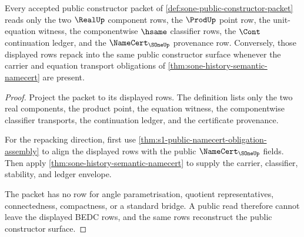 \begin{theorem}
\label{thm:sone-public-constructor-scope}
Every accepted public constructor packet of
\autoref{def:sone-public-constructor-packet} reads only the two $\RealUp$
component rows, the $\ProdUp$ point row, the unit-equation witness, the
componentwise $\hsame$ classifier rows, the $\Cont$ continuation ledger, and the
$\NameCert_{\SOneUp}$ provenance row. Conversely, those displayed rows repack
into the same public constructor surface whenever the carrier and equation
transport obligations of \autoref{thm:sone-history-semantic-namecert} are
present.
\end{theorem}
\begin{proof}
Project the packet to its displayed rows. The definition lists only the two real
components, the product point, the equation witness, the componentwise
classifier transports, the continuation ledger, and the certificate provenance.

For the repacking direction, first use
\autoref{thm:s1-public-namecert-obligation-assembly} to align the displayed
rows with the public $\NameCert_{\SOneUp}$ fields. Then apply
\autoref{thm:sone-history-semantic-namecert} to supply the carrier, classifier,
stability, and ledger envelope.

The packet has no row for angle parametrisation, quotient representatives,
connectedness, compactness, or a standard bridge. A public read therefore cannot
leave the displayed BEDC rows, and the same rows reconstruct the public
constructor surface.
\end{proof}

